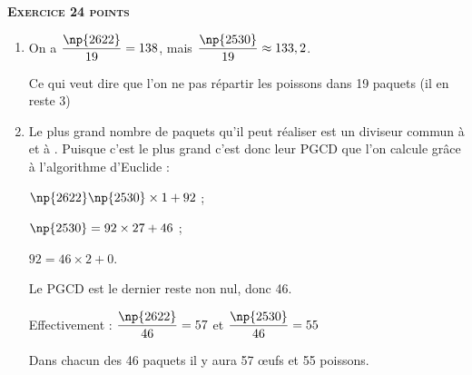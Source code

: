 \textbf{\textsc{Exercice 2\hfill 4 points}}

\medskip

%
%
%

\begin{enumerate}
\item %
On a $\dfrac{\np{2622}}{19} = 138$, mais $\dfrac{\np{2530}}{19} \approx  133,2$.

Ce qui veut dire que l'on ne pas répartir les  poissons dans 19 paquets (il en reste 3)
\item %
Le plus grand nombre de paquets qu'il peut réaliser est un diviseur commun à  et à . Puisque c'est le plus grand c'est donc leur PGCD que l'on calcule grâce à l'algorithme d'Euclide :

$\np{2622}  \np{2530} \times 1 + 92$ ;

$\np{2530} =  92 \times 27  + 46$ ;

$92 = 46 \times 2 + 0$.

Le PGCD est le dernier reste non nul, donc 46.

Effectivement : $\dfrac{\np{2622}}{46} = 57$ et   $\dfrac{\np{2530}}{46} = 55$

Dans chacun des 46 paquets il y aura 57 œufs et 55 poissons.
\end{enumerate}

\vspace{0.5cm}

